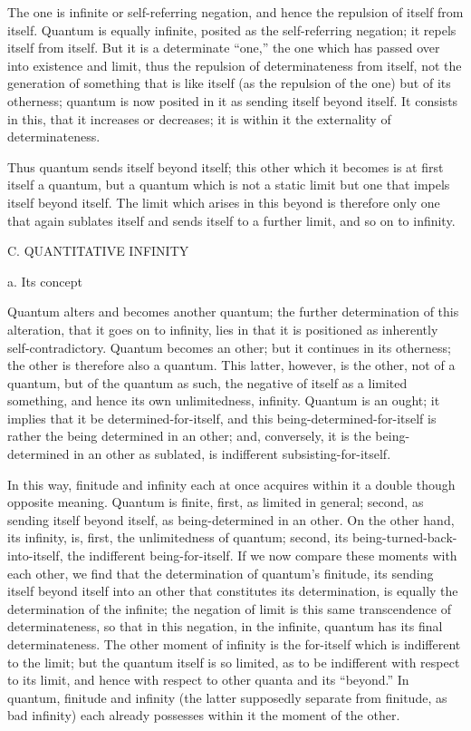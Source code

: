 The one is infinite or self-referring negation,
and hence the repulsion of itself from itself.
Quantum is equally infinite,
posited as the self-referring negation;
it repels itself from itself.
But it is a determinate “one,”
the one which has passed over into existence and limit,
thus the repulsion of determinateness from itself,
not the generation of something that is like itself
(as the repulsion of the one) but of its otherness;
quantum is now posited in it as sending itself beyond itself.
It consists in this, that it increases or decreases;
it is within it the externality of determinateness.

Thus quantum sends itself beyond itself;
this other which it becomes is at first itself a quantum,
but a quantum which is not a static limit
but one that impels itself beyond itself.
The limit which arises in this beyond is
therefore only one that again sublates itself
and sends itself to a further limit,
and so on to infinity.

C. QUANTITATIVE INFINITY

a. Its concept

Quantum alters and becomes another quantum;
the further determination of this alteration,
that it goes on to infinity,
lies in that it is positioned as
inherently self-contradictory.
Quantum becomes an other;
but it continues in its otherness;
the other is therefore also a quantum.
This latter, however, is the other,
not of a quantum, but of the quantum as such,
the negative of itself as a limited something,
and hence its own unlimitedness, infinity.
Quantum is an ought; it implies that it be determined-for-itself,
and this being-determined-for-itself is rather
the being determined in an other;
and, conversely, it is the being-determined in
an other as sublated, is indifferent subsisting-for-itself.

In this way, finitude and infinity each at once acquires
within it a double though opposite meaning.
Quantum is finite, first, as limited in general;
second, as sending itself beyond itself,
as being-determined in an other.
On the other hand, its infinity, is,
first, the unlimitedness of quantum;
second, its being-turned-back-into-itself,
the indifferent being-for-itself.
If we now compare these moments with each other,
we find that the determination of quantum's finitude,
its sending itself beyond itself into an other
that constitutes its determination,
is equally the determination of the infinite;
the negation of limit is this
same transcendence of determinateness,
so that in this negation, in the infinite,
quantum has its final determinateness.
The other moment of infinity is the for-itself
which is indifferent to the limit;
but the quantum itself is so limited,
as to be indifferent with respect to its limit,
and hence with respect to other quanta and its “beyond.”
In quantum, finitude and infinity
(the latter supposedly separate from finitude, as bad infinity)
each already possesses within it the moment of the other.

